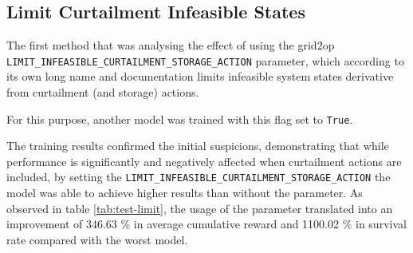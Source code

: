 \subsection{Limit Curtailment Infeasible States} \label{sec:results-limit}

The first method that was analysing the effect of using the grid2op  \texttt{LIMIT\_INFEASIBLE\_CURTAILMENT\_STORAGE\_ACTION} parameter, which according to its own long name and documentation limits infeasible system states derivative from curtailment (and storage) actions. \par
For this purpose, another model was trained with this flag set to \texttt{True}. 

The training results confirmed the initial suspicions, demonstrating that while performance is significantly and negatively affected when curtailment actions are included, by setting the \texttt{LIMIT\_INFEASIBLE\_CURTAILMENT\_STORAGE\_ACTION} the model was able to achieve higher results than without the parameter. As observed in table \ref{tab:test-limit}, the usage of the parameter translated into an improvement of 346.63 \% in average cumulative reward and 1100.02 \% in survival rate compared with the worst model. \par

